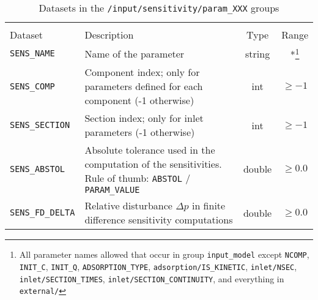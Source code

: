 \begin{table}[!ht]
\footnotesize
\begin{tabu}to \linewidth[m]{lX[m]cc} \toprule
{} \\
\rowfont[c]\normalfont Dataset & Description & Type & Range \everyrow{\midrule}\\      
\texttt{SENS\_NAME} & Name of the parameter & string & *\footnote{All parameter names allowed that occur in group \texttt{input\_model} except \texttt{NCOMP}, \texttt{INIT\_C}, \texttt{INIT\_Q}, \texttt{ADSORPTION\_TYPE}, \texttt{adsorption/IS\_KINETIC}, \texttt{inlet/NSEC}, \texttt{inlet/SECTION\_TIMES}, \texttt{inlet/SECTION\_CONTINUITY}, and everything in \texttt{external/}} \\
\texttt{SENS\_COMP} & Component index; only for parameters defined for each component (-1 otherwise) & int & $\geq -1$\\
\texttt{SENS\_SECTION} & Section index; only for inlet parameters (-1 otherwise) & int & $\geq -1$\\
\texttt{SENS\_ABSTOL} & Absolute tolerance used in the computation of the sensitivities. Rule of thumb: \texttt{ABSTOL} / \texttt{PARAM\_VALUE} & double & $\geq 0.0$\\
\texttt{SENS\_FD\_DELTA} & Relative disturbance $\Delta p$ in finite difference sensitivity computations & double & $\geq 0.0$\everyrow{}\\
\bottomrule
\end{tabu}
\caption{\label{tab:FFSensitivityParam}Datasets in the \texttt{/input/sensitivity/param\_XXX} groups}
\end{table}


